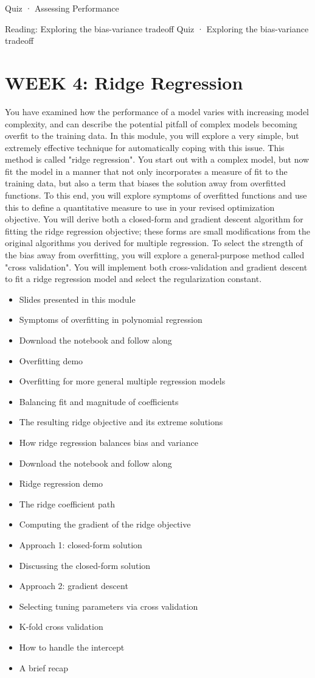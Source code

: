 Quiz · Assessing Performance
\item Reading: Exploring the bias-variance tradeoff
Quiz · Exploring the bias-variance tradeoff
\section*{WEEK 4: Ridge Regression}
You have examined how the performance of a model varies with increasing model complexity, and can describe the potential pitfall of complex models becoming overfit to the training data. In this module, you will explore a very simple, but extremely effective technique for automatically coping with this issue. This method is called "ridge regression". You start out with a complex model, but now fit the model in a manner that not only incorporates a measure of fit to the training data, but also a term that biases the solution away from overfitted functions. To this end, you will explore symptoms of overfitted functions and use this to define a quantitative measure to use in your revised optimization objective. You will derive both a closed-form and gradient descent algorithm for fitting the ridge regression objective; these forms are small modifications from the original algorithms you derived for multiple regression. To select the strength of the bias away from overfitting, you will explore a general-purpose method called "cross validation".
You will implement both cross-validation and gradient descent to fit a ridge regression model and select the regularization constant.
\begin{itemize}
\item Slides presented in this module
\item Symptoms of overfitting in polynomial regression
\item Download the notebook and follow along
\item Overfitting demo
\item Overfitting for more general multiple regression models
\item Balancing fit and magnitude of coefficients
\item The resulting ridge objective and its extreme solutions
\item How ridge regression balances bias and variance
\item Download the notebook and follow along
\item Ridge regression demo
\item The ridge coefficient path
\item Computing the gradient of the ridge objective
\item Approach 1: closed-form solution
\item Discussing the closed-form solution
\item Approach 2: gradient descent
\item Selecting tuning parameters via cross validation
\item K-fold cross validation
\item How to handle the intercept
\item A brief recap
\end{itemize}
